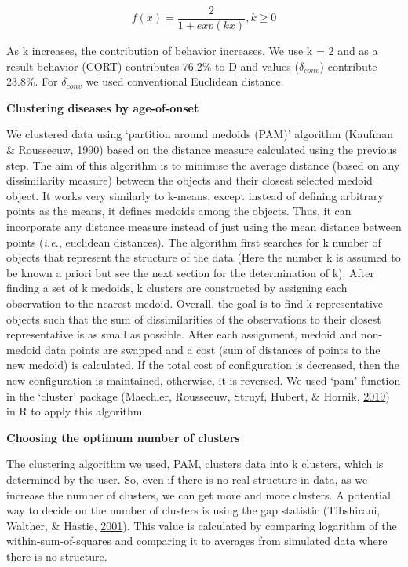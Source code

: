 \documentclass[12pt,twoside]{unicam}
\begin{document}
\begin{equation}
    f(x) = \dfrac{2}{1+exp(kx)}, k≥0
  \label{eq:disexpadaptivetuning}
\end{equation}

As k increases, the contribution of behavior increases. We use k = 2 and as a result behavior (CORT) contributes 76.2\% to D and values (\(\delta_{conv}\)) contribute 23.8\%. For \(\delta_{conv}\) we used conventional Euclidean distance.

\textbf{Clustering diseases by age-of-onset}

We clustered data using `partition around medoids (PAM)' algorithm (Kaufman \& Rousseeuw, \protect\hyperlink{ref-Kaufman1990}{1990}) based on the distance measure calculated using the previous step. The aim of this algorithm is to minimise the average distance (based on any dissimilarity measure) between the objects and their closest selected medoid object. It works very similarly to k-means, except instead of defining arbitrary points as the means, it defines medoids among the objects. Thus, it can incorporate any distance measure instead of just using the mean distance between points (\emph{i.e.}, euclidean distances). The algorithm first searches for k number of objects that represent the structure of the data (Here the number k is assumed to be known a priori but see the next section for the determination of k). After finding a set of k medoids, k clusters are constructed by assigning each observation to the nearest medoid. Overall, the goal is to find k representative objects such that the sum of dissimilarities of the observations to their closest representative is as small as possible. After each assignment, medoid and non-medoid data points are swapped and a cost (sum of distances of points to the new medoid) is calculated. If the total cost of configuration is decreased, then the new configuration is maintained, otherwise, it is reversed. We used `pam' function in the `cluster' package (Maechler, Rousseeuw, Struyf, Hubert, \& Hornik, \protect\hyperlink{ref-Maechler2019}{2019}) in R to apply this algorithm.

\textbf{Choosing the optimum number of clusters}

The clustering algorithm we used, PAM, clusters data into k clusters, which is determined by the user. So, even if there is no real structure in data, as we increase the number of clusters, we can get more and more clusters. A potential way to decide on the number of clusters is using the gap statistic (Tibshirani, Walther, \& Hastie, \protect\hyperlink{ref-Tibshirani2001}{2001}). This value is calculated by comparing logarithm of the within-sum-of-squares and comparing it to averages from simulated data where there is no structure.
\end{document}
